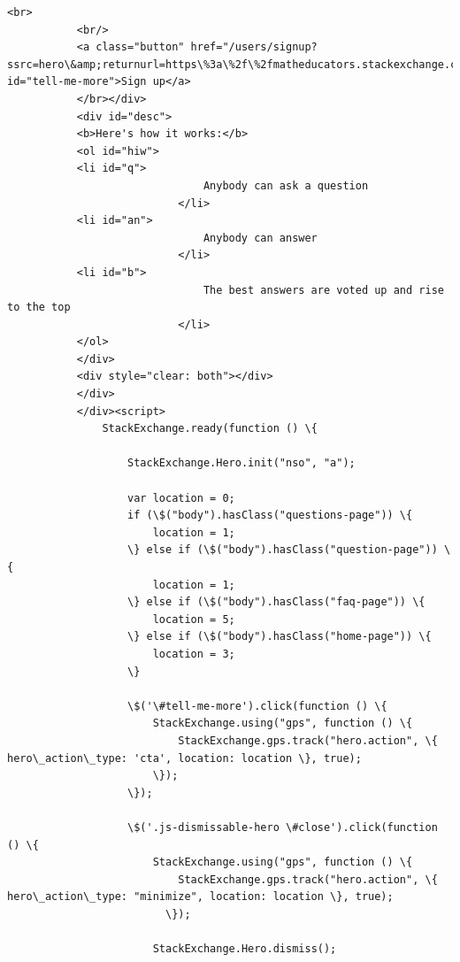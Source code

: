 \documentclass[11pt]{article}
\begin{document}
\begin{Verbatim}[commandchars=\\\{\}]
                       <br>
           <br/>
           <a class="button" href="/users/signup?ssrc=hero\&amp;returnurl=https\%3a\%2f\%2fmatheducators.stackexchange.com\%2f" id="tell-me-more">Sign up</a>
           </br></div>
           <div id="desc">
           <b>Here's how it works:</b>
           <ol id="hiw">
           <li id="q">
                               Anybody can ask a question
                           </li>
           <li id="an">
                               Anybody can answer
                           </li>
           <li id="b">
                               The best answers are voted up and rise to the top
                           </li>
           </ol>
           </div>
           <div style="clear: both"></div>
           </div>
           </div><script>
               StackExchange.ready(function () \{
           
                   StackExchange.Hero.init("nso", "a");
           
                   var location = 0;
                   if (\$("body").hasClass("questions-page")) \{
                       location = 1;
                   \} else if (\$("body").hasClass("question-page")) \{
                       location = 1;
                   \} else if (\$("body").hasClass("faq-page")) \{
                       location = 5;
                   \} else if (\$("body").hasClass("home-page")) \{
                       location = 3;
                   \}
           
                   \$('\#tell-me-more').click(function () \{
                       StackExchange.using("gps", function () \{
                           StackExchange.gps.track("hero.action", \{ hero\_action\_type: 'cta', location: location \}, true);
                       \});
                   \});
           
                   \$('.js-dismissable-hero \#close').click(function () \{
                       StackExchange.using("gps", function () \{
                           StackExchange.gps.track("hero.action", \{ hero\_action\_type: "minimize", location: location \}, true);
                         \});
           
                       StackExchange.Hero.dismiss();
           

\end{Verbatim}
\end{document}
